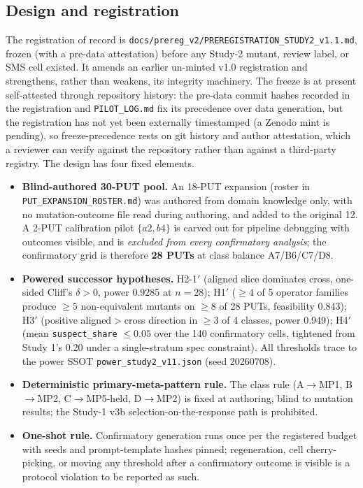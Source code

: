 \documentclass[manuscript,screen,review]{acmart}
\begin{document}
\subsection{Design and registration}\label{study2-design}

The registration of record is
\texttt{docs/prereg\_v2/PREREGISTRATION\_STUDY2\_v1.1.md}, frozen (with a
pre-data attestation) before any Study-2 mutant, review label, or SMS
cell existed. It amends an earlier un-minted v1.0 registration and
strengthens, rather than weakens, its integrity machinery. The freeze is
at present self-attested through repository history: the pre-data commit
hashes recorded in the registration and \texttt{PILOT\_LOG.md} fix its
precedence over data generation, but the registration has not yet been
externally timestamped (a Zenodo mint is pending), so freeze-precedence
rests on git history and author attestation, which a reviewer can verify
against the repository rather than against a third-party registry. The
design has four fixed elements.

\begin{itemize}

\item
  \textbf{Blind-authored 30-PUT pool.} An 18-PUT expansion (roster in
  \texttt{PUT\_EXPANSION\_ROSTER.md}) was authored from domain knowledge
  only, with no mutation-outcome file read during authoring, and added
  to the original 12. A 2-PUT calibration pilot \(\{a2, b4\}\) is carved
  out for pipeline debugging with outcomes visible, and is
  \emph{excluded from every confirmatory analysis}; the confirmatory
  grid is therefore \textbf{28 PUTs} at class balance A7/B6/C7/D8.
\item
  \textbf{Powered successor hypotheses.} H2-1\('\) (aligned slice
  dominates cross, one-sided Cliff's \(\delta > 0\), power 0.9285 at
  \(n = 28\)); H1\('\) (\(\geq 4\) of 5 operator families produce
  \(\geq 5\) non-equivalent mutants on \(\geq 8\) of 28 PUTs, feasibility
  0.843); H3\('\) (positive aligned\(>\)cross direction in \(\geq 3\) of
  4 classes, power 0.949); H4\('\) (mean \texttt{suspect\_share}
  \(\leq 0.05\) over the 140 confirmatory cells, tightened from Study
  1's 0.20 under a single-stratum spec constraint). All thresholds trace
  to the power SSOT \texttt{power\_study2\_v11.json} (seed 20260708).
\item
  \textbf{Deterministic primary-meta-pattern rule.} The class rule
  (A\(\to\)MP1, B\(\to\)MP2, C\(\to\)MP5-held, D\(\to\)MP2) is fixed at
  authoring, blind to mutation results; the Study-1 v3b
  selection-on-the-response path is prohibited.
\item
  \textbf{One-shot rule.} Confirmatory generation runs once per the
  registered budget with seeds and prompt-template hashes pinned;
  regeneration, cell cherry-picking, or moving any threshold after a
  confirmatory outcome is visible is a protocol violation to be reported
  as such.
\end{itemize}
\end{document}
